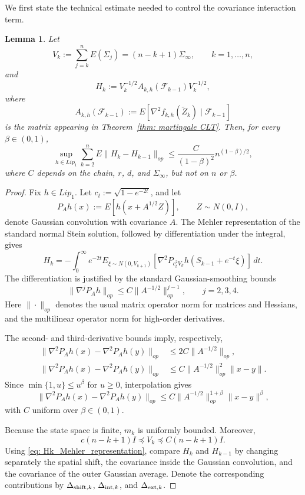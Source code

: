 \documentclass[11pt]{article}
\newtheorem{lemma}{Lemma}
\begin{document}
We first state the technical estimate needed to control the covariance
interaction term.

\begin{lemma}
\label{lem: H_variation}
Let
\[
    V_k:=\sum_{j=k}^n E(\Sigma_j)=(n-k+1)\Sigma_\infty,
    \qquad k=1,\ldots,n,
\]
and
\[
    H_k:=V_k^{-1/2}A_{k,h}(\mathcal F_{k-1})V_k^{-1/2},
\]
where
\[
    A_{k,h}(\mathcal F_{k-1})
    :=E[\nabla^2f_{k,h}(\widetilde Z_k)\mid\mathcal F_{k-1}]
\]
is the matrix appearing in Theorem~\ref{thm: martingale CLT}. Then, for every
$\beta\in(0,1)$,
\[
    \sup_{h\in Lip_1}\sum_{k=2}^nE\|H_k-H_{k-1}\|_{op}
    \le \frac{C}{(1-\beta)^2}n^{(1-\beta)/2},
\]
where $C$ depends on the chain, $r$, $d$, and $\Sigma_\infty$, but not on
$n$ or $\beta$.
\end{lemma}

\begin{proof}
Fix $h\in Lip_1$. Let $c_t:=\sqrt{1-e^{-2t}}$, and let
\[
    P_Ah(x):=E[h(x+A^{1/2}Z)],\qquad Z\sim N(0,I),
\]
denote Gaussian convolution with covariance $A$. The Mehler representation
of the standard normal Stein solution, followed by differentiation under the
integral, gives
\begin{equation}\label{eq: Hk_Mehler_representation}
    H_k=-\int_0^\infty e^{-2t}
    E_{\xi\sim N(0,V_{k+1})}
    [\nabla^2P_{c_t^2V_k}h(S_{k-1}+e^{-t}\xi)]\,dt.
\end{equation}
The differentiation is justified by the standard Gaussian-smoothing bounds
\[
    \|\nabla^jP_Ah\|_{op}
    \le C\|A^{-1/2}\|_{op}^{j-1},\qquad j=2,3,4.
\]
Here $\|\cdot\|_{op}$ denotes the usual matrix operator norm for matrices and Hessians, and the multilinear operator norm for high-order derivatives.


The second- and third-derivative bounds imply, respectively,
\[
\begin{split}
\|\nabla^2P_Ah(x)-\nabla^2P_Ah(y)\|_{op}
&\le 2C\|A^{-1/2}\|_{op},\\
\|\nabla^2P_Ah(x)-\nabla^2P_Ah(y)\|_{op}
&\le C\|A^{-1/2}\|_{op}^2\|x-y\|.
\end{split}
\]
Since $\min\{1,u\}\le u^\beta$ for $u\ge0$, interpolation gives
\begin{equation}\label{eq: uniform_fractional_smoothing}
\|\nabla^2P_Ah(x)-\nabla^2P_Ah(y)\|_{op}
\le C\|A^{-1/2}\|_{op}^{1+\beta}\|x-y\|^\beta,
\end{equation}
with $C$ uniform over $\beta\in(0,1)$.

Because the state space is finite, $m_k$ is uniformly bounded. Moreover,
\[
    c(n-k+1)I\preceq V_k\preceq C(n-k+1)I.
\]
Using \eqref{eq: Hk_Mehler_representation}, compare $H_k$ and $H_{k-1}$ by
changing separately the spatial shift, the covariance inside the Gaussian
convolution, and the covariance of the outer Gaussian average. Denote the
corresponding contributions by $\Delta_{{\rm shift},k}$,
$\Delta_{{\rm int},k}$, and $\Delta_{{\rm ext},k}$.


\end{proof}
\end{document}
